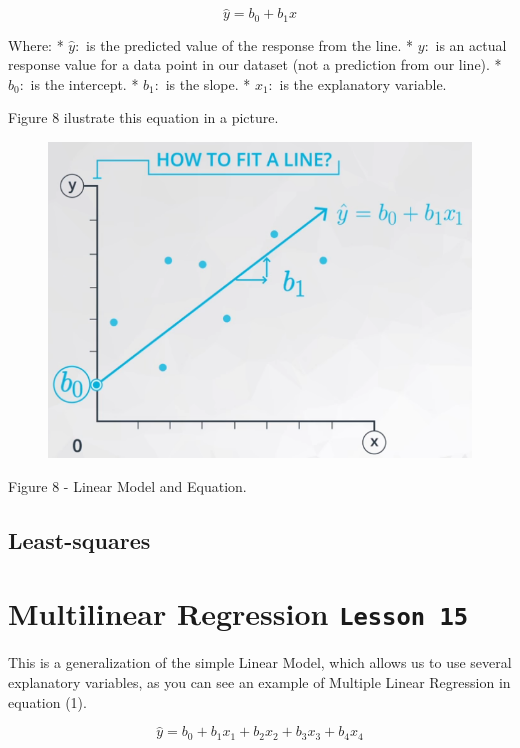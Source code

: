 \documentclass[]{book}
\begin{document}
\[ \hat y = b_0 + b_1x \]

Where: * \(\hat y:\) is the predicted value of the response from the
line. * \(y:\) is an actual response value for a data point in our
dataset (not a prediction from our line). * \(b_0:\) is the intercept. *
\(b_1:\) is the slope. * \(x_1:\) is the explanatory variable.

Figure 8 ilustrate this equation in a picture.

\begin{figure}
\centering
\includegraphics{01-img/c4_l14_08.png}
\caption{}
\end{figure}

Figure 8 - Linear Model and Equation.

\subsection{Least-squares}\label{least-squares}

\section{\texorpdfstring{Multilinear Regression
\texttt{Lesson\ 15}}{Multilinear Regression Lesson 15}}\label{multilinear-regression-lesson-15}

This is a generalization of the simple Linear Model, which allows us to
use several explanatory variables, as you can see an example of Multiple
Linear Regression in equation (1).

\[ \hat y = b_0 + b_1x_1 + b_2x_2 + b_3x_3 + b_4x_4 \tag{1} \]
\end{document}
